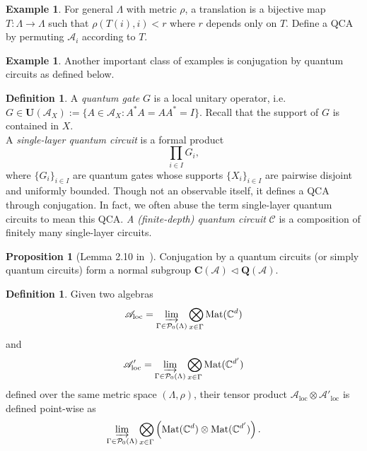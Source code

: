 \documentclass{article}
\theoremstyle{definition}
\newtheorem{defn}[theorem]{Definition}
\newtheorem{exmp}[theorem]{Example}
\newtheorem{prop}[theorem]{Proposition}
\newcommand{\CC}{{\mathbb C}}
\newcommand{\SA}{{\mathscr A}}
\begin{document}
\begin{exmp}
    For general $\Lambda$ with metric $\rho$, a translation is a bijective map $T: \Lambda\rightarrow \Lambda$ such that $\rho(T(i), i)<r$ where $r$ depends only on $T$. Define a QCA by permuting $\SA_i$ according to $T$. 
\end{exmp}

\begin{exmp}
    Another important class of examples is conjugation by quantum circuits as defined below.  
\end{exmp}

\begin{defn}
    A \textit{quantum gate} $G$ is a local unitary operator, i.e. $G\in \mathbf U(\SA_X) :=\{A\in \SA_X: A^*A=AA^*=I\}$. Recall that the support of $G$ is contained in $X$.\\
    A \textit{single-layer quantum circuit} is a formal product $$\prod_{i\in I}G_i,$$ where $\{G_i\}_{i\in I}$ are quantum gates whose supports $\{X_i\}_{i\in I}$  are pairwise disjoint and uniformly bounded. Though not an observable itself, it defines a QCA through conjugation. In fact, we often abuse the term single-layer quantum circuits to mean this QCA. \textit{A (finite-depth) quantum circuit}  $\mathscr C$ is a composition of finitely many single-layer circuits.
\end{defn}

\begin{prop}[Lemma 2.10 in~\cite{freedman2020classification}]
    Conjugation by a quantum circuits (or simply quantum circuits) form a normal subgroup $\mathbf{C}(\SA)\triangleleft\mathbf{Q}(\SA)$.
\end{prop}

\begin{defn}
    Given two algebras $$\SA_{\mathrm{loc}}=\varinjlim_{\Gamma\in \mathcal P_0(\Lambda)}\bigotimes_{x\in \Gamma}\mathrm{Mat}(\CC^d)$$ and $$\SA'_{\mathrm{loc}}=\varinjlim_{\Gamma\in \mathcal P_0(\Lambda)}\bigotimes_{x\in \Gamma}\mathrm{Mat}(\CC^{d'})$$ defined over the same metric space $(\Lambda, \rho)$, their tensor product $\SA_{\mathrm{loc}}\otimes \SA'_{\mathrm{loc}}$ is defined point-wise as
    $$\varinjlim_{\Gamma\in \mathcal P_0(\Lambda)}\bigotimes_{x\in \Gamma}\left(\mathrm{Mat}(\CC^d)\otimes \mathrm{Mat}(\CC^{d'})\right).$$
\end{defn}
\end{document}
